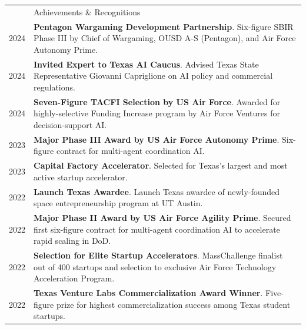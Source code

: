 \documentclass[letterpaper, 11pt]{article}
\newcommand{\headingfont}{\Large\color{CustomBlue}}
\newenvironment{SectionTable}[1]{
	\renewcommand*{\arraystretch}{1.3} %
	\setlength{\tabcolsep}{10pt}
	\begin{longtable}{Rp{4.9in}} & #1 \\}
{\end{longtable}}
\begin{document}
\vspace{-0.5cm}


\begin{SectionTable}{\headingfont Achievements \& Recognitions}




2024 & \textbf{Pentagon Wargaming Development Partnership}. Six-figure SBIR Phase III by Chief of Wargaming, OUSD A-S (Pentagon), and Air Force Autonomy Prime. \\

2024 & \textbf{Invited Expert to Texas AI Caucus}. Advised Texas State Representative Giovanni Capriglione on AI policy and commercial regulations. \\

2024 & \textbf{Seven-Figure TACFI Selection by US Air Force}. Awarded for highly-selective Funding Increase program by Air Force Ventures for decision-support AI. \\

2023 & \textbf{Major Phase III Award by US Air Force Autonomy Prime}. Six-figure contract for multi-agent coordination AI. \\


2023 & \textbf{Capital Factory Accelerator}. Selected for Texas's largest and most active startup accelerator. \\

2022 & \textbf{Launch Texas Awardee}. Launch Texas awardee of newly-founded space entrepreneurship program at UT Austin. \\

2022 & \textbf{Major Phase II Award by US Air Force Agility Prime}. Secured first six-figure contract for multi-agent coordination AI to accelerate rapid scaling in DoD. \\

2022 & \textbf{Selection for Elite Startup Accelerators}. MassChallenge finalist out of 400 startups and selection to exclusive Air Force Technology Acceleration Program. \\

2022 & \textbf{Texas Venture Labs Commercialization Award Winner}. Five-figure prize for highest commercialization success among Texas student startups. \\


\end{SectionTable}
\end{document}
